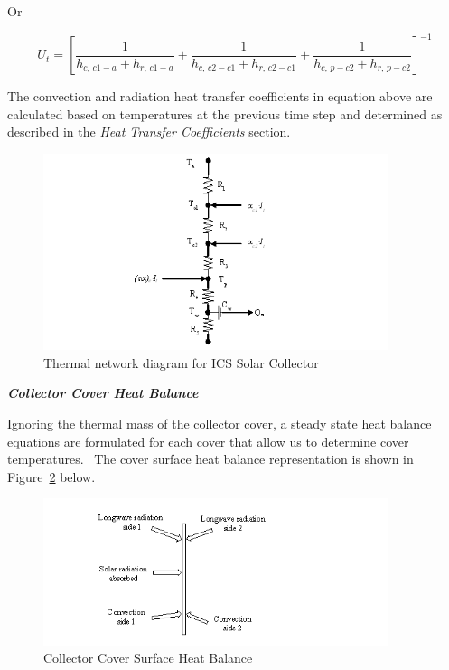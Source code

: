 Or

\begin{equation}
{U_t} = {\left[ {\frac{1}{{{h_{c,\,c1 - a}} + {h_{r,\,c1 - a}}}} + \frac{1}{{{h_{c,\,c2 - c1}} + {h_{r,\,c2 - c1}}}} + \frac{1}{{{h_{c,\,p - c2}} + {h_{r,\,p - c2}}}}} \right]^{ - 1}}
\end{equation}

The convection and radiation heat transfer coefficients in equation above are calculated based on temperatures at the previous time step and determined as described in the \emph{Heat Transfer Coefficients} section.

\begin{figure}[hbtp] %
\centering
\includegraphics[width=0.9\textwidth, height=0.9\textheight, keepaspectratio=true]{media/image6522.png}
\caption{Thermal network diagram for ICS Solar Collector \protect \label{fig:thermal-network-diagram-for-ics-solar}}
\end{figure}

\textbf{\emph{Collector Cover Heat Balance}}

Ignoring the thermal mass of the collector cover, a steady state heat balance equations are formulated for each cover that allow us to determine cover temperatures.~ The cover surface heat balance representation is shown in Figure~\ref{fig:collector-cover-surface-heat-balance} below.

\begin{figure}[hbtp] %
\centering
\includegraphics[width=0.9\textwidth, height=0.9\textheight, keepaspectratio=true]{media/image6523.png}
\caption{Collector Cover Surface Heat Balance \protect \label{fig:collector-cover-surface-heat-balance}}
\end{figure}


